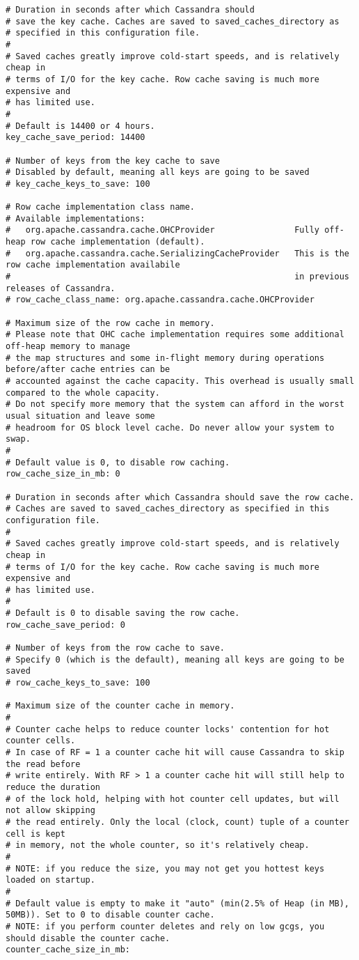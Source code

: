 \begin{verbatim}
# Duration in seconds after which Cassandra should
# save the key cache. Caches are saved to saved_caches_directory as
# specified in this configuration file.
#
# Saved caches greatly improve cold-start speeds, and is relatively cheap in
# terms of I/O for the key cache. Row cache saving is much more expensive and
# has limited use.
#
# Default is 14400 or 4 hours.
key_cache_save_period: 14400

# Number of keys from the key cache to save
# Disabled by default, meaning all keys are going to be saved
# key_cache_keys_to_save: 100

# Row cache implementation class name.
# Available implementations:
#   org.apache.cassandra.cache.OHCProvider                Fully off-heap row cache implementation (default).
#   org.apache.cassandra.cache.SerializingCacheProvider   This is the row cache implementation availabile
#                                                         in previous releases of Cassandra.
# row_cache_class_name: org.apache.cassandra.cache.OHCProvider

# Maximum size of the row cache in memory.
# Please note that OHC cache implementation requires some additional off-heap memory to manage
# the map structures and some in-flight memory during operations before/after cache entries can be
# accounted against the cache capacity. This overhead is usually small compared to the whole capacity.
# Do not specify more memory that the system can afford in the worst usual situation and leave some
# headroom for OS block level cache. Do never allow your system to swap.
#
# Default value is 0, to disable row caching.
row_cache_size_in_mb: 0

# Duration in seconds after which Cassandra should save the row cache.
# Caches are saved to saved_caches_directory as specified in this configuration file.
#
# Saved caches greatly improve cold-start speeds, and is relatively cheap in
# terms of I/O for the key cache. Row cache saving is much more expensive and
# has limited use.
#
# Default is 0 to disable saving the row cache.
row_cache_save_period: 0

# Number of keys from the row cache to save.
# Specify 0 (which is the default), meaning all keys are going to be saved
# row_cache_keys_to_save: 100

# Maximum size of the counter cache in memory.
#
# Counter cache helps to reduce counter locks' contention for hot counter cells.
# In case of RF = 1 a counter cache hit will cause Cassandra to skip the read before
# write entirely. With RF > 1 a counter cache hit will still help to reduce the duration
# of the lock hold, helping with hot counter cell updates, but will not allow skipping
# the read entirely. Only the local (clock, count) tuple of a counter cell is kept
# in memory, not the whole counter, so it's relatively cheap.
#
# NOTE: if you reduce the size, you may not get you hottest keys loaded on startup.
#
# Default value is empty to make it "auto" (min(2.5% of Heap (in MB), 50MB)). Set to 0 to disable counter cache.
# NOTE: if you perform counter deletes and rely on low gcgs, you should disable the counter cache.
counter_cache_size_in_mb:


\end{verbatim}
